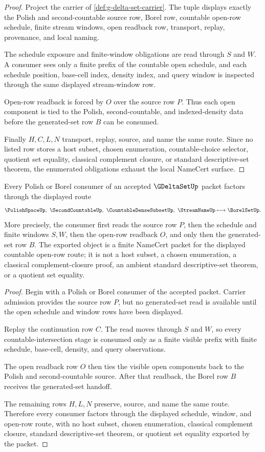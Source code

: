 \begin{proof}
Project the carrier of \autoref{def:g-delta-set-carrier}. The tuple displays exactly the Polish and second-countable source row, Borel row, countable open-row schedule, finite stream windows, open readback row, transport, replay, provenance, and local naming.

The schedule exposure and finite-window obligations are read through $S$ and $W$. A consumer sees only a finite prefix of the countable open schedule, and each schedule position, base-cell index, density index, and query window is inspected through the same displayed stream-window row.

Open-row readback is forced by $O$ over the source row $P$. Thus each open component is tied to the Polish, second-countable, and indexed-density data before the generated-set row $B$ can be consumed.

Finally $H,C,L,N$ transport, replay, source, and name the same route. Since no listed row stores a host subset, chosen enumeration, countable-choice selector, quotient set equality, classical complement closure, or standard descriptive-set theorem, the enumerated obligations exhaust the local NameCert surface.
\end{proof}

\begin{theorem}
\label{thm:g-delta-set-polish-borel-handoff}
Every Polish or Borel consumer of an accepted $\GDeltaSetUp$ packet factors through the displayed route
$$
\PolishSpaceUp,\ \SecondCountableUp,\ \CountableDenseSubsetUp,\ \StreamNameUp
\longmapsto
\BorelSetUp .
$$
More precisely, the consumer first reads the source row $P$, then the schedule and finite windows $S,W$, then the open-row readback $O$, and only then the generated-set row $B$. The exported object is a finite NameCert packet for the displayed countable open-row route; it is not a host subset, a chosen enumeration, a classical complement-closure proof, an ambient standard descriptive-set theorem, or a quotient set equality.
\end{theorem}
\begin{proof}
Begin with a Polish or Borel consumer of the accepted packet. Carrier admission provides the source row $P$, but no generated-set read is available until the open schedule and window rows have been displayed.

Replay the continuation row $C$. The read moves through $S$ and $W$, so every countable-intersection stage is consumed only as a finite visible prefix with finite schedule, base-cell, density, and query observations.

The open readback row $O$ then ties the visible open components back to the Polish and second-countable source. After that readback, the Borel row $B$ receives the generated-set handoff.

The remaining rows $H,L,N$ preserve, source, and name the same route. Therefore every consumer factors through the displayed schedule, window, and open-row route, with no host subset, chosen enumeration, classical complement closure, standard descriptive-set theorem, or quotient set equality exported by the packet.
\end{proof}

